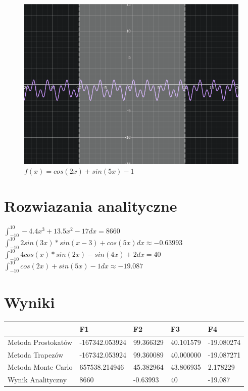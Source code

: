 \documentclass{article}
\begin{document}
\begin{figure}[H]
    \centering
    \includegraphics[width=\textwidth]{"../assets/f_4.png"}
    \caption{$f(x) = cos(2x) + sin(5x) - 1$}
    \label{fig:f_4}
\end{figure}

\clearpage

\section*{Rozwiazania analityczne}

${\int_{-10}^{10} -4.4x^3 + 13.5x^2 - 17 dx  = 8660}$ \newline \newline
${\int_{-10}^{10} 2sin(3x) * sin(x-3) + cos(5x) dx  \approx -0.63993}$ \newline \newline
${\int_{-10}^{10} 4cos(x) * sin(2x) - sin(4x) + 2 dx  = 40}$ \newline \newline
${\int_{-10}^{10} cos(2x) + sin(5x) - 1 dx  \approx -19.087}$

\section*{Wyniki}

\begin{table}[H]
    \begin{tabular}{|l|l|l|l|l|}
    \hline
                       & F1             & F2        & F3        & F4         \\ \hline
    Metoda Prostokatów & -167342.053924 & 99.366329 & 40.101579 & -19.080274 \\ \hline
    Metoda Trapezów    & -167342.053924 & 99.360089 & 40.000000 & -19.087271 \\ \hline
    Metoda Monte Carlo & 657538.214946  & 45.382964 & 43.806935 & 2.178229   \\ \hline
    Wynik Analityczny  & 8660           & -0.63993  & 40        & -19.087    \\ \hline
\end{tabular}
\end{table}
\end{document}
